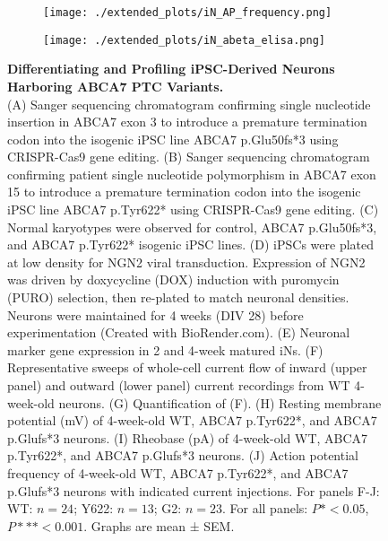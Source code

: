 \begin{figure}[ht]
\begin{subfigure}[t]{0.25\textwidth}
    \end{subfigure} 
    \hspace{1cm}
    \begin{subfigure}[t]{0.3\textwidth}
        \caption{}
        \texttt{[image: ./extended\_plots/iN\_AP\_frequency.png]}        
    \end{subfigure}  
    \hspace{1cm}
    \begin{subfigure}[t]{0.35\textwidth}
        \caption{}
        \texttt{[image: ./extended\_plots/iN\_abeta\_elisa.png]}        
    \end{subfigure}  
    \caption{
        \textbf{Differentiating and Profiling iPSC-Derived Neurons Harboring ABCA7 PTC Variants.}\\[1ex]
        (A) Sanger sequencing chromatogram confirming single nucleotide insertion in ABCA7 exon 3 to introduce a premature termination codon into the isogenic iPSC line ABCA7 p.Glu50fs*3 using CRISPR-Cas9 gene editing. 
        (B) Sanger sequencing chromatogram confirming patient single nucleotide polymorphism in ABCA7 exon 15 to introduce a premature termination codon into the isogenic iPSC line ABCA7 p.Tyr622* using CRISPR-Cas9 gene editing. 
        (C) Normal karyotypes were observed for control, ABCA7 p.Glu50fs*3, and ABCA7 p.Tyr622* isogenic iPSC lines. 
        (D) iPSCs were plated at low density for NGN2 viral transduction. Expression of NGN2 was driven by doxycycline (DOX) induction with puromycin (PURO) selection, then re-plated to match neuronal densities. Neurons were maintained for 4 weeks (DIV 28) before experimentation (Created with BioRender.com). 
        (E) Neuronal marker gene expression in 2 and 4-week matured iNs. 
        (F) Representative sweeps of whole-cell current flow of inward (upper panel) and outward (lower panel) current recordings from WT 4-week-old neurons. 
        (G) Quantification of (F). 
        (H) Resting membrane potential (mV) of 4-week-old WT, ABCA7 p.Tyr622*, and ABCA7 p.Glufs*3 neurons. 
        (I) Rheobase (pA) of 4-week-old WT, ABCA7 p.Tyr622*, and ABCA7 p.Glufs*3 neurons. 
        (J) Action potential frequency of 4-week-old WT, ABCA7 p.Tyr622*, and ABCA7 p.Glufs*3 neurons with indicated current injections. For panels F-J: WT: $n=24$; Y622: $n=13$; G2: $n=23$. For all panels: $P*<0.05$, $P***<0.001$. Graphs are mean ± SEM.
    }
    \label{fig:differentiating_iPSC_neurons}
\end{figure}